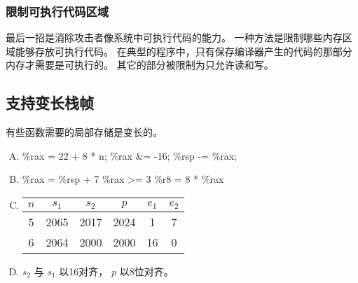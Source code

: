 {{        \subsubsection{限制可执行代码区域}
        {
            最后一招是消除攻击者像系统中可执行代码的能力。
            一种方法是限制哪些内存区域能够存放可执行代码。
            在典型的程序中，只有保存编译器产生的代码的那部分内存才需要是可执行的。
            其它的部分被限制为只允许读和写。
        }
    }

    \subsection{支持变长栈帧}
    {
        有些函数需要的局部存储是变长的。

        \begin{practicec}
            \begin{enumerate}[A.]
                \item
                {
                    \%rax = 22 + 8 * n;
                    \%rax \&= -16;
                    \%rsp -= \%rax;
                }
                \item
                {
                    \%rax = \%rsp + 7
                    \%rax >= 3
                    \%r8 = 8 * \%rax
                }
                \item
                {
                    \begin{table}[htb]
                        \begin{tabular}{|cccccc|}
                            \hline
                            $n$ & $s_1$ & $s_2$ & $p$ & $e_1$ & $e_2$ \\
                            \hline
                            5 & 2065 & 2017 & 2024 & 1 & 7 \\
                            6 & 2064 & 2000 & 2000 & 16 & 0 \\
                            \hline
                        \end{tabular}
                    \end{table}
                }
                \item
                {
                    $s_2$ 与 $s_1$ 以16对齐， $p$ 以8位对齐。
                }
            \end{enumerate}
        \end{practicec}
    }
}
